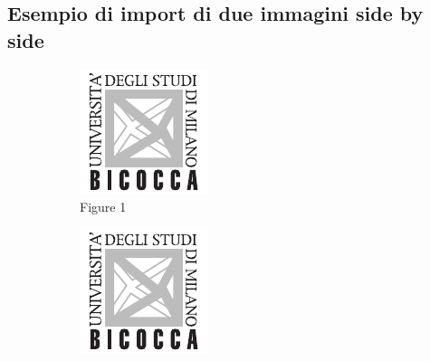     \subsection{Esempio di import di due immagini side by side}
        \begin{figure}[h]
            \centering
            \begin{subfigure}{0.4\textwidth}
                \includegraphics[width=\linewidth]{assets/images/logo_unimib.pdf}
                \caption{Figure 1}
                \label{fig:logo_unimib2}
            \end{subfigure}
            \hfill
            \begin{subfigure}{0.4\textwidth}
                \includegraphics[width=\linewidth]{assets/images/logo_unimib.pdf}

\end{subfigure}
\end{figure}
